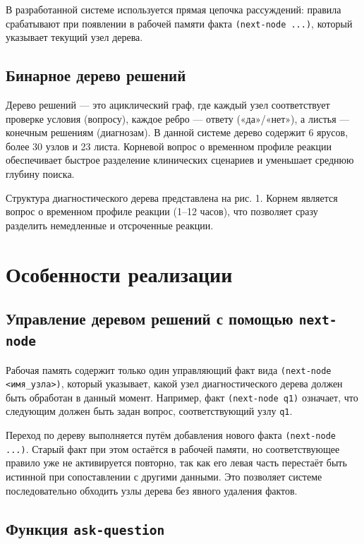 \documentclass[a4paper, final]{extarticle}
\begin{document}
	В разработанной системе используется прямая цепочка рассуждений: правила срабатывают при появлении в рабочей памяти факта \texttt{(next-node ...)}, который указывает текущий узел дерева.
	
	\subsection{Бинарное дерево решений}
	
	Дерево решений — это ациклический граф, где каждый узел соответствует проверке условия (вопросу), каждое ребро — ответу («да»/«нет»), а листья — конечным решениям (диагнозам). В данной системе дерево содержит 6 ярусов, более 30 узлов и 23 листа. Корневой вопрос о временном профиле реакции обеспечивает быстрое разделение клинических сценариев и уменьшает среднюю глубину поиска.
	
	Структура диагностического дерева представлена на рис. 1. Корнем является вопрос о временном профиле реакции (1–12 часов), что позволяет сразу разделить немедленные и отсроченные реакции.
	
	
	
	\setcounter{figure}{1}
	
	\newpage
	
	\section{Особенности реализации}
	
	\subsection{Управление деревом решений с помощью \texttt{next-node}}
	
	Рабочая память содержит только один управляющий факт вида \texttt{(next-node <имя\_узла>)}, который указывает, какой узел диагностического дерева должен быть обработан в данный момент. Например, факт \texttt{(next-node q1)} означает, что следующим должен быть задан вопрос, соответствующий узлу \texttt{q1}.
	
	Переход по дереву выполняется путём добавления нового факта \texttt{(next-node ...)}. Старый факт при этом остаётся в рабочей памяти, но соответствующее правило уже не активируется повторно, так как его левая часть перестаёт быть истинной при сопоставлении с другими данными. Это позволяет системе последовательно обходить узлы дерева без явного удаления фактов.
	
	\subsection{Функция \texttt{ask-question}}
	
\end{document}
